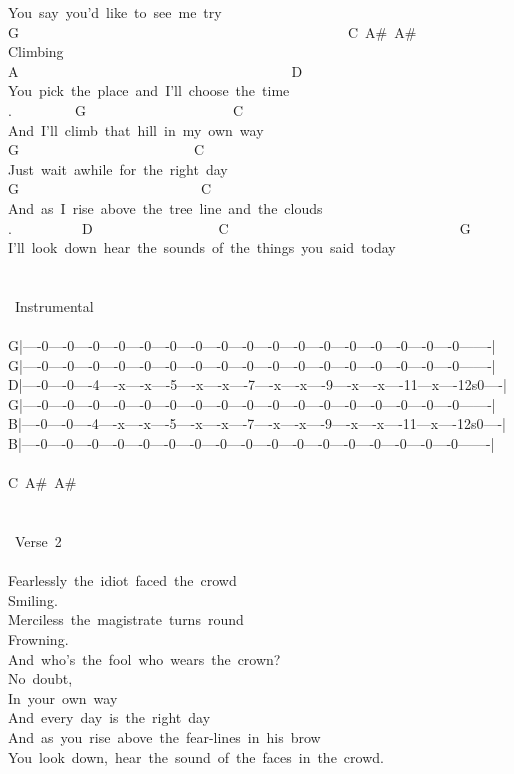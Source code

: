 {You\ say\ you'd\ like\ to\ see\ me\ try\\
G\ \ \ \ \ \ \ \ \ \ \ \ \ \ \ \ \ \ \ \ \ \ \ \ \ \ \ \ \ \ \ \ \ \ \ \ \ \ \ \ \ \ \ \ \ \ \ C\ A\#\ A\#\\
Climbing\\
A\ \ \ \ \ \ \ \ \ \ \ \ \ \ \ \ \ \ \ \ \ \ \ \ \ \ \ \ \ \ \ \ \ \ \ \ \ \ \ D\\
You\ pick\ the\ place\ and\ I'll\ choose\ the\ time\\
.\ \ \ \ \ \ \ \ \ G\ \ \ \ \ \ \ \ \ \ \ \ \ \ \ \ \ \ \ \ \ C\\
And\ I'll\ climb\ that\ hill\ in\ my\ own\ way\\
G\ \ \ \ \ \ \ \ \ \ \ \ \ \ \ \ \ \ \ \ \ \ \ \ \ C\\
Just\ wait\ awhile\ for\ the\ right\ day\\
G\ \ \ \ \ \ \ \ \ \ \ \ \ \ \ \ \ \ \ \ \ \ \ \ \ \ C\\
And\ as\ I\ rise\ above\ the\ tree\ line\ and\ the\ clouds\\
.\ \ \ \ \ \ \ \ \ \ D\ \ \ \ \ \ \ \ \ \ \ \ \ \ \ \ \ \ C\ \ \ \ \ \ \ \ \ \ \ \ \ \ \ \ \ \ \ \ \ \ \ \ \ \ \ \ \ \ \ \ \ G\\
I'll\ look\ down\ hear\ the\ sounds\ of\ the\ things\ you\ said\ today\\
\\
\\
\lbrack\ Instrumental\rbrack\\
\\
G|----0----0----0----0----0----0----0----0----0----0----0----0----0----0----0----0----0-------|\\
G|----0----0----0----0----0----0----0----0----0----0----0----0----0----0----0----0----0-------|\\
D|----0----0----4----x----x----5----x----x----7----x----x----9----x----x----11---x----12s0----|\\
G|----0----0----0----0----0----0----0----0----0----0----0----0----0----0----0----0----0-------|\\
B|----0----0----4----x----x----5----x----x----7----x----x----9----x----x----11---x----12s0----|\\
B|----0----0----0----0----0----0----0----0----0----0----0----0----0----0----0----0----0-------|\\
\\
C\ A\#\ A\#\\
\\
\\
\lbrack\ Verse\ 2\rbrack\\
\\
Fearlessly\ the\ idiot\ faced\ the\ crowd\\
Smiling.\\
Merciless\ the\ magistrate\ turns\ round\\
Frowning.\\
And\ who's\ the\ fool\ who\ wears\ the\ crown?\\
No\ doubt,\\
In\ your\ own\ way\\
And\ every\ day\ is\ the\ right\ day\\
And\ as\ you\ rise\ above\ the\ fear-lines\ in\ his\ brow\\
You\ look\ down,\ hear\ the\ sound\ of\ the\ faces\ in\ the\ crowd.}
